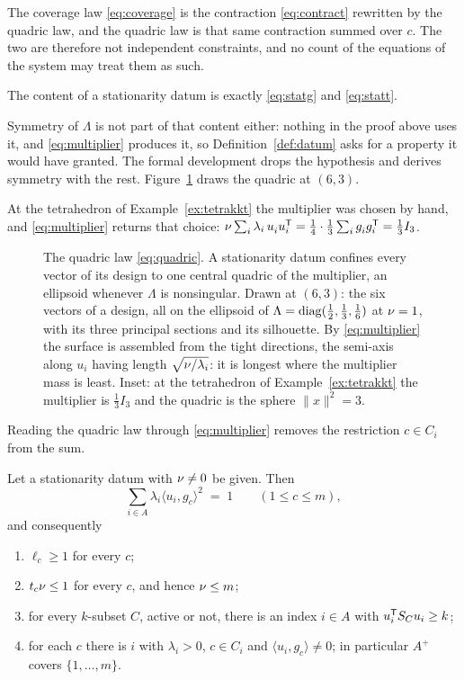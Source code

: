 The coverage law \eqref{eq:coverage} is the contraction
\eqref{eq:contract} rewritten by the quadric law, and the quadric law is
that same contraction summed over $c$.  The two are therefore not
independent constraints, and no count of the equations of the system may
treat them as such.

The content of a stationarity datum is exactly \eqref{eq:statg} and
\eqref{eq:statt}.

Symmetry of $\Lambda$ is not part of that content either: nothing in the
proof above uses it, and \eqref{eq:multiplier} produces it, so
Definition~\ref{def:datum} asks for a property it would have granted.  The
formal development drops the hypothesis and derives symmetry with the
rest.  Figure~\ref{fig:quadric} draws the quadric at $(6,3)$.

At the tetrahedron of Example~\ref{ex:tetrakkt} the multiplier was chosen
by hand, and \eqref{eq:multiplier} returns that choice:
$\cv\sum_i\lambda_i\,u_i^{\vphantom{\mathsf{T}}}u_i\tp
=\tfrac14\cdot\tfrac13\sum_ig_i^{\vphantom{\mathsf{T}}}g_i\tp=\tfrac13I_3$.

\begin{figure}[ht]
  \centering
  
  \caption{The quadric law \eqref{eq:quadric}.  A stationarity datum confines
  every vector of its design to one central quadric of the multiplier, an
  ellipsoid whenever $\Lambda$ is nonsingular.  Drawn at $(6,3)$: the six
  vectors of a design, all on the ellipsoid of
  $\Lambda=\operatorname{diag}(\tfrac12,\tfrac13,\tfrac16)$ at $\nu=1$, with its three
  principal sections and its silhouette.  By \eqref{eq:multiplier} the surface
  is assembled from the tight directions, the semi-axis along $u_i$ having
  length $\sqrt{\nu/\lambda_i}$: it is longest where the multiplier mass is
  least.  Inset: at the tetrahedron of Example~\ref{ex:tetrakkt} the multiplier
  is $\tfrac13I_3$ and the quadric is the sphere $\lVert x\rVert^2=3$.}
  \label{fig:quadric}
\end{figure}

Reading the quadric law through \eqref{eq:multiplier} removes the
restriction $c\in C_i$ from the sum.

\begin{lemma}[Lean]\label{lem:overlap}
Let a stationarity datum with $\nu\ne0$ be given.  Then
\begin{equation}\label{eq:overlapone}
  \sum_{i\in A}\lambda_i\langle u_i,g_c\rangle^2\;=\;1
  \qquad(1\le c\le m),
\end{equation}
and consequently
\begin{enumerate}
\item[\rm(i)] $\ell_c\ge1$ for every $c$;
\item[\rm(ii)] $t_c\nu\le1$ for every $c$, and hence $\nu\le m$;
\item[\rm(iii)] for every $k$-subset $C$, active or not, there is an
  index $i\in A$ with $u_i^{\mathsf{T}}S_{C} u_i\ge k$;
\item[\rm(iv)] for each $c$ there is $i$ with $\lambda_i>0$, $c\in C_i$
  and $\langle u_i,g_c\rangle\ne0$; in particular $A^{+}$ covers
  $\{1,\dots,m\}$.
\end{enumerate}
\end{lemma}

